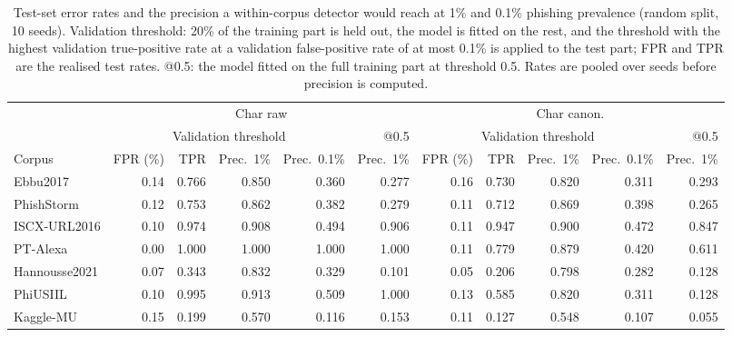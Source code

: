 \begin{table}[tp]
\centering
\caption{Test-set error rates and the precision a within-corpus detector would reach at 1\% and 0.1\% phishing prevalence (random split, 10 seeds). Validation threshold: 20\% of the training part is held out, the model is fitted on the rest, and the threshold with the highest validation true-positive rate at a validation false-positive rate of at most 0.1\% is applied to the test part; FPR and TPR are the realised test rates. @0.5: the model fitted on the full training part at threshold 0.5. Rates are pooled over seeds before precision is computed.}
\label{tab:precision}
\footnotesize
\setlength{\tabcolsep}{3pt}
\begin{adjustbox}{max width=\linewidth}
\begin{tabular}{@{}lrrrrrrrrrr@{}}
\toprule
 & \multicolumn{5}{c}{Char raw} & \multicolumn{5}{c}{Char canon.} \\
\cmidrule(lr){2-6}\cmidrule(lr){7-11}
 & \multicolumn{4}{c}{Validation threshold} & @0.5 & \multicolumn{4}{c}{Validation threshold} & @0.5 \\
\cmidrule(lr){2-5}\cmidrule(lr){6-6}\cmidrule(lr){7-10}\cmidrule(lr){11-11}
Corpus & FPR (\%) & TPR & Prec.\ 1\% & Prec.\ 0.1\% & Prec.\ 1\% & FPR (\%) & TPR & Prec.\ 1\% & Prec.\ 0.1\% & Prec.\ 1\% \\
\midrule
Ebbu2017 & 0.14 & 0.766 & 0.850 & 0.360 & 0.277 & 0.16 & 0.730 & 0.820 & 0.311 & 0.293 \\
PhishStorm & 0.12 & 0.753 & 0.862 & 0.382 & 0.279 & 0.11 & 0.712 & 0.869 & 0.398 & 0.265 \\
ISCX-URL2016 & 0.10 & 0.974 & 0.908 & 0.494 & 0.906 & 0.11 & 0.947 & 0.900 & 0.472 & 0.847 \\
PT-Alexa & 0.00 & 1.000 & 1.000 & 1.000 & 1.000 & 0.11 & 0.779 & 0.879 & 0.420 & 0.611 \\
Hannousse2021 & 0.07 & 0.343 & 0.832 & 0.329 & 0.101 & 0.05 & 0.206 & 0.798 & 0.282 & 0.128 \\
PhiUSIIL & 0.10 & 0.995 & 0.913 & 0.509 & 1.000 & 0.13 & 0.585 & 0.820 & 0.311 & 0.128 \\
Kaggle-MU & 0.15 & 0.199 & 0.570 & 0.116 & 0.153 & 0.11 & 0.127 & 0.548 & 0.107 & 0.055 \\
\bottomrule
\end{tabular}
\end{adjustbox}
\end{table}
